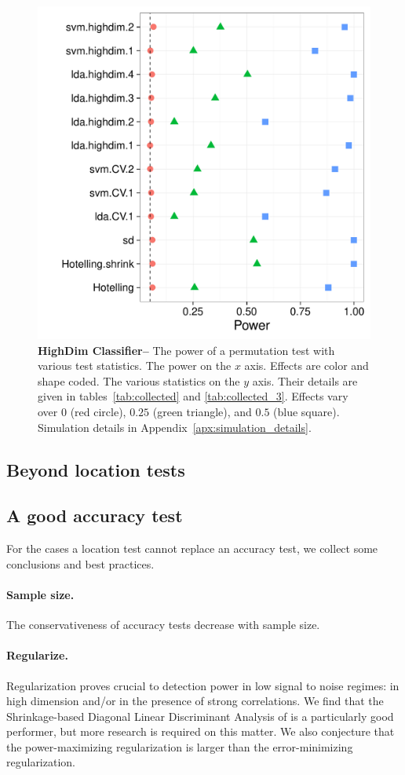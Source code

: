 \documentclass[12pt,a4paper]{article}
\begin{document}
\begin{figure}[ht]
\centering
	  \includegraphics[width=0.7\linewidth]{"art/2016-08-17 08:48:18"}
	  \caption{
\textbf{HighDim Classifier--} 
		The power of a permutation test with various test statistics. 
		The power on the $x$ axis. 
		Effects are color and shape coded. 
		The various statistics on the $y$ axis. 
		Their details are given in tables~\ref{tab:collected} and \ref{tab:collected_3}. 
		Effects vary over $0$ (red circle), $0.25$ (green triangle), and $0.5$ (blue square). 
		Simulation details in Appendix~\ref{apx:simulation_details}.
} 
	\label{fig:highdim}
\end{figure}



\subsection{Beyond location tests}



\subsection{A good accuracy test}
For the cases a location test cannot replace an accuracy test, we collect some conclusions and best practices.

\paragraph{Sample size.} The conservativeness of accuracy tests decrease with sample size. 


\paragraph{Regularize.}
Regularization proves crucial to detection power in low signal to noise regimes: in high dimension and\slash or in the presence of strong correlations. 
We find that the Shrinkage-based Diagonal Linear Discriminant Analysis of \cite{pang_shrinkage-based_2009} is a particularly good performer, but more research is required on this matter. 
We also conjecture that the power-maximizing regularization is larger than the error-minimizing regularization.
\end{document}
